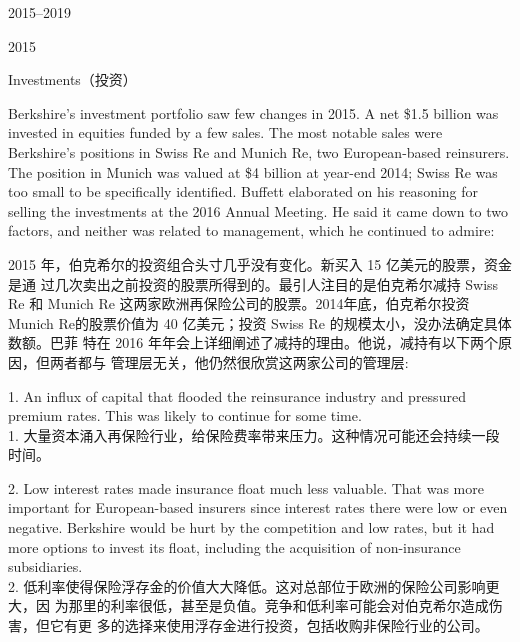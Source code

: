 \begin{chapter}{2015--2019}
\begin{section}{2015}
\begin{subsection}{Investments（投资）}
\begin{verseparallel}
{    Berkshire's investment portfolio saw few changes in 2015. A net \$1.5
    billion was invested in equities funded by a few sales. The most notable
    sales were Berkshire’s positions in Swiss Re and Munich Re, two
    European-based reinsurers. The position in Munich was valued at \$4 billion
    at year-end 2014; Swiss Re was too small to be specifically identified.
    Buffett elaborated on his reasoning for selling the investments at the 2016
    Annual Meeting. He said it came down to two factors, and neither was
    related to management, which he continued to admire:    

  }
  {
    2015 年，伯克希尔的投资组合头寸几乎没有变化。新买入 15 亿美元的股票，资金是通
    过几次卖出之前投资的股票所得到的。最引人注目的是伯克希尔减持 Swiss
    Re 和 Munich Re 这两家欧洲再保险公司的股票。2014年底，伯克希尔投资 Munich
    Re的股票价值为 40 亿美元；投资 Swiss Re 的规模太小，没办法确定具体数额。巴菲
    特在 2016 年年会上详细阐述了减持的理由。他说，减持有以下两个原因，但两者都与
    管理层无关，他仍然很欣赏这两家公司的管理层:
  }
\end{verseparallel}    

{\color{green}{此处应为列表项 \\}}

\begin{verseparallel}
  {
    1. An influx of capital that flooded the reinsurance industry and pressured
    premium rates. This was likely to continue for some time. \\
  }
  {
    1. 大量资本涌入再保险行业，给保险费率带来压力。这种情况可能还会持续一段时间。
  }
\end{verseparallel}

\begin{verseparallel}
  {
    2. Low interest rates made insurance float much less valuable. That was more
    important for European-based insurers since interest rates there were low or
    even negative. Berkshire would be hurt by the competition and low rates, but
    it had more options to invest its float, including the acquisition of
    non-insurance subsidiaries. \\
  }
  {
    2. 低利率使得保险浮存金的价值大大降低。这对总部位于欧洲的保险公司影响更大，因
    为那里的利率很低，甚至是负值。竞争和低利率可能会对伯克希尔造成伤害，但它有更
    多的选择来使用浮存金进行投资，包括收购非保险行业的公司。
  }
\end{verseparallel}


\end{subsection}
\end{section}
\end{chapter}
